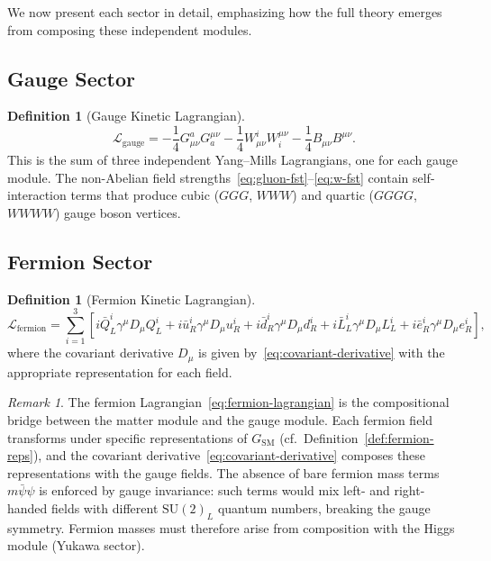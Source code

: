 \documentclass[12pt]{article}
\theoremstyle{definition}
\newtheorem{definition}[theorem]{Definition}
\theoremstyle{remark}
\newtheorem{remark}[theorem]{Remark}
\newcommand{\lag}{\mathcal{L}}
\newcommand{\su}[1]{\mathrm{SU}(#1)}
\newcommand{\dmu}{D_\mu}
\newcommand{\gmu}{\gamma^\mu}
\begin{document}
We now present each sector in detail, emphasizing how the full theory emerges from composing these independent modules.

\subsection{Gauge Sector}

\begin{definition}[Gauge Kinetic Lagrangian]
\label{def:gauge-lagrangian}
\begin{equation}
\label{eq:gauge-lagrangian}
\lag_{\mathrm{gauge}} = -\frac{1}{4} G^a_{\mu\nu} G_a^{\mu\nu} - \frac{1}{4} W^i_{\mu\nu} W_i^{\mu\nu} - \frac{1}{4} B_{\mu\nu} B^{\mu\nu}.
\end{equation}
This is the sum of three independent Yang--Mills Lagrangians, one for each gauge module. The non-Abelian field strengths~\eqref{eq:gluon-fst}--\eqref{eq:w-fst} contain self-interaction terms that produce cubic ($GGG$, $WWW$) and quartic ($GGGG$, $WWWW$) gauge boson vertices.
\end{definition}

\subsection{Fermion Sector}

\begin{definition}[Fermion Kinetic Lagrangian]
\label{def:fermion-lagrangian}
\begin{equation}
\label{eq:fermion-lagrangian}
\lag_{\mathrm{fermion}} = \sum_{i=1}^{3} \left[ i \bar{Q}_L^i \gmu \dmu Q_L^i + i \bar{u}_R^i \gmu \dmu u_R^i + i \bar{d}_R^i \gmu \dmu d_R^i + i \bar{L}_L^i \gmu \dmu L_L^i + i \bar{e}_R^i \gmu \dmu e_R^i \right],
\end{equation}
where the covariant derivative $\dmu$ is given by~\eqref{eq:covariant-derivative} with the appropriate representation for each field.
\end{definition}

\begin{remark}
The fermion Lagrangian~\eqref{eq:fermion-lagrangian} is the compositional bridge between the matter module and the gauge module. Each fermion field transforms under specific representations of $G_{\mathrm{SM}}$ (cf.\ Definition~\ref{def:fermion-reps}), and the covariant derivative~\eqref{eq:covariant-derivative} composes these representations with the gauge fields. The absence of bare fermion mass terms $m \bar{\psi}\psi$ is enforced by gauge invariance: such terms would mix left- and right-handed fields with different $\su{2}_L$ quantum numbers, breaking the gauge symmetry. Fermion masses must therefore arise from composition with the Higgs module (Yukawa sector).
\end{remark}
\end{document}
